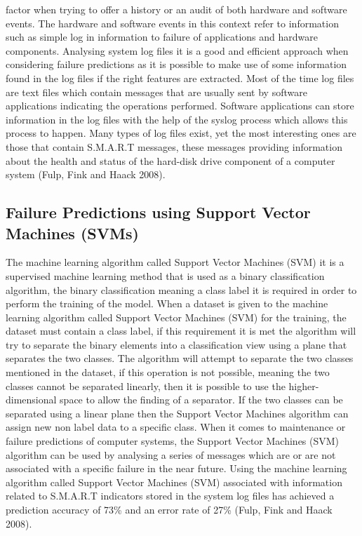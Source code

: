 factor when trying to offer a history or an audit of both hardware and software events. The hardware and software
events in this context refer to information such as simple log in information to failure of applications and
hardware components. Analysing system log files it is a good and efficient approach when considering failure
predictions as it is possible to make use of some information found in the log files if the right features are
extracted. Most of the time log files are text files which contain messages that are usually sent by software
applications indicating the operations performed. Software applications can store information in the log files
with the help of the syslog process which allows this process to happen. Many types of log files exist, yet the
most interesting ones are those that contain S.M.A.R.T messages, these messages providing information about the
health and status of the hard-disk drive component of a computer system (Fulp, Fink and Haack 2008).

\subsection{Failure Predictions using Support Vector Machines (SVMs)}

The machine learning algorithm called Support Vector Machines (SVM) it is a supervised machine learning method
that is used as a binary classification algorithm, the binary classification meaning a class label it is
required in order to perform the training of the model. When a dataset is given to the machine learning
algorithm called Support Vector Machines (SVM) for the training, the dataset must contain a class label,
if this requirement it is met the algorithm will try to separate the binary elements into a classification
view using a plane that separates the two classes. The algorithm will attempt to separate the two classes
mentioned in the dataset, if this operation is not possible, meaning the two classes cannot be separated
linearly, then it is possible to use the higher-dimensional space to allow the finding of a separator.
If the two classes can be separated using a linear plane then the Support Vector Machines algorithm can
assign new non label data to a specific class. When it comes to maintenance or failure predictions of
computer systems, the Support Vector Machines (SVM) algorithm can be used by analysing a series of messages
which are or are not associated with a specific failure in the near future. Using the machine learning
algorithm called Support Vector Machines (SVM) associated with information related to S.M.A.R.T indicators
stored in the system log files has achieved a prediction accuracy of 73\% and an error rate of 27\%
(Fulp, Fink and Haack 2008).

